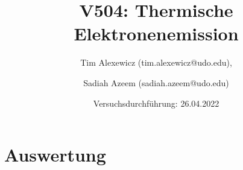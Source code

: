 













\title{V504: Thermische Elektronenemission}
\author{Tim Alexewicz (tim.alexewicz@udo.edu), \and Sadiah Azeem (sadiah.azeem@udo.edu)}
\date{Versuchsdurchführung: 26.04.2022}

\maketitle
\thispagestyle{empty}
\newpage
\thispagestyle{empty}
\tableofcontents
\newpage
\setcounter{page}{1}

\section{Auswertung}
